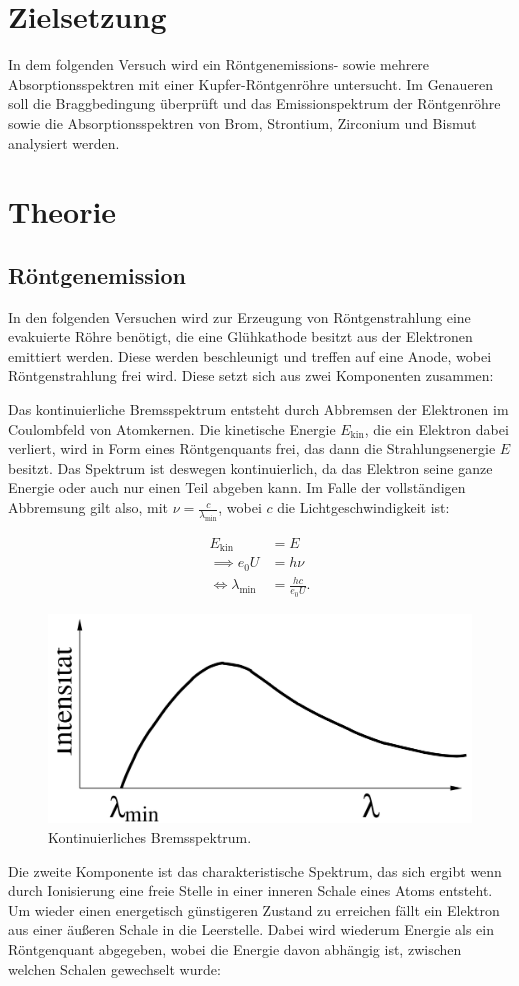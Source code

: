 \section{Zielsetzung}
In dem folgenden Versuch wird ein Röntgenemissions- sowie mehrere Absorptionsspektren mit einer Kupfer-Röntgenröhre untersucht. Im Genaueren soll die Braggbedingung überprüft und das Emissionspektrum der Röntgenröhre sowie die Absorptionsspektren von Brom, 
Strontium, Zirconium und Bismut analysiert werden.

\section{Theorie}
\subsection{Röntgenemission}
In den folgenden Versuchen wird zur Erzeugung von Röntgenstrahlung eine evakuierte Röhre benötigt, die eine Glühkathode besitzt aus der Elektronen emittiert werden. Diese werden beschleunigt und treffen auf eine Anode, wobei Röntgenstrahlung frei wird.
Diese setzt sich aus zwei Komponenten zusammen:

Das kontinuierliche Bremsspektrum entsteht durch Abbremsen der Elektronen im Coulombfeld von Atomkernen. Die kinetische Energie $E_{\text{kin}}$, die ein Elektron dabei verliert, wird in Form eines Röntgenquants frei, das dann die Strahlungsenergie $E$ besitzt. 
Das Spektrum ist deswegen kontinuierlich, da das Elektron seine ganze Energie oder auch nur einen Teil abgeben kann. Im Falle der vollständigen Abbremsung gilt also, mit $\nu = \frac{c}{\lambda_{\text{min}}}$, wobei $c$ die Lichtgeschwindigkeit ist:

\begin{equation}
\begin{aligned}
E_{\text{kin}} &= E \\
\implies e_0 U &= h \nu \\
\iff \lambda_{\text{min}} &= \frac{h c}{e_0 U}.
\end{aligned}
\end{equation}

\begin{figure}[h!]
	\centering
	\includegraphics[width=0.5\linewidth]{kontSpektrum.png}
	\caption{Kontinuierliches Bremsspektrum. \cite[1]{anleitung602}}
	\label{fig:kontspekt}
\end{figure}
Die zweite Komponente ist das charakteristische Spektrum, das sich ergibt wenn durch Ionisierung eine freie Stelle in einer inneren Schale eines Atoms entsteht. Um wieder einen energetisch günstigeren Zustand zu erreichen fällt ein Elektron aus einer äußeren Schale
in die Leerstelle. Dabei wird wiederum Energie als ein Röntgenquant abgegeben, wobei die Energie davon abhängig ist, zwischen welchen Schalen gewechselt wurde:


